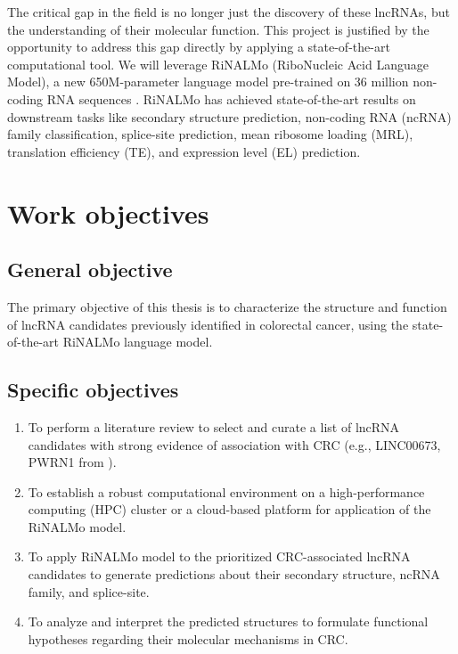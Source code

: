 \documentclass[ENG]{TFUOC}%
\begin{document}
The critical gap in the field is no longer just the discovery of these lncRNAs, but the understanding of their molecular function. This project is justified by the opportunity to address this gap directly by applying a state-of-the-art computational tool. We will leverage RiNALMo (RiboNucleic Acid Language Model), a new 650M-parameter language model pre-trained on 36 million non-coding RNA sequences \cite{penicRiNALMoGeneralpurposeRNA2025}. RiNALMo has achieved state-of-the-art results on downstream tasks like secondary structure prediction, non-coding RNA (ncRNA) family classification, splice-site prediction, mean ribosome loading (MRL), translation efficiency (TE), and expression level (EL) prediction.


\section{Work objectives}

\subsection{General objective}
The primary objective of this thesis is to characterize the structure and function of lncRNA candidates previously identified in colorectal cancer, using the state-of-the-art RiNALMo language model.

\subsection{Specific objectives}

\begin{enumerate}
    \item To perform a literature review to select and curate a list of lncRNA candidates with strong evidence of association with CRC (e.g., LINC00673, PWRN1 from \cite{cornishGenomicLandscape20232024a}).
    \item To establish a robust computational environment on a high-performance computing (HPC) cluster or a cloud-based platform for application of the RiNALMo model. 
    \item To apply RiNALMo model to the prioritized CRC-associated lncRNA candidates to generate predictions about their secondary structure, ncRNA family, and splice-site.
    \item To analyze and interpret the predicted structures to formulate functional hypotheses regarding their molecular mechanisms in CRC.
\end{enumerate}
\end{document}
